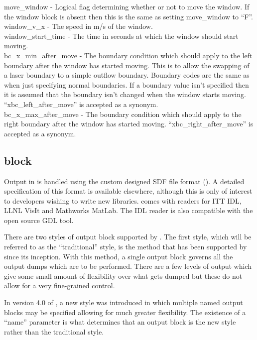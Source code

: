 {\emphtext move\_window} - Logical flag determining whether or not to move the
  window. If the window block is absent then this is the same as setting
  move\_window to ``F''.\\

{\emphtext window\_v\_x} - The speed in m/s of the window.\\

{\emphtext window\_start\_time} - The time in seconds at which the window should
  start moving.\\

{\emphtext bc\_x\_min\_after\_move} - The boundary condition which should apply
  to the left boundary after the window has started moving. This is to allow
  the swapping of a laser boundary to a simple outflow boundary. Boundary codes
  are the same as when just specifying normal boundaries. If a boundary value
  isn't specified then it is assumed that the boundary isn't changed when the
  window starts moving. ``xbc\_left\_after\_move'' is accepted as a synonym.\\

{\emphtext bc\_x\_max\_after\_move} - The boundary condition which should apply
  to the right boundary after the window has started moving.
  ``xbc\_right\_after\_move'' is accepted as a synonym.


\subsection{ block}
\label{sec:output_block}
Output in {\EPOCH} is handled using the custom designed SDF file format
(). A detailed specification of this
format is available elsewhere, although this is only of interest to
developers wishing to write new libraries.
{\EPOCH} comes with readers for ITT IDL, LLNL VisIt and Mathworks MatLab.
The IDL reader is also compatible with the open source GDL tool.

There are two styles of output block supported by {\EPOCH}. The first
style, which will be referred to as the ``traditional'' style, is the
method that has been supported by {\EPOCH} since its inception. With this
method, a single output block governs all the output dumps which are to be
performed. There are a few levels of output which give some small amount of
flexibility over what gets dumped but these do not allow for a very
fine-grained control.

In version 4.0 of {\EPOCH}, a new style was introduced in which multiple
named output blocks may be specified allowing for much greater flexibility.
The existence of a ``name'' parameter is what determines that an output block
is the new style rather than the traditional style.

